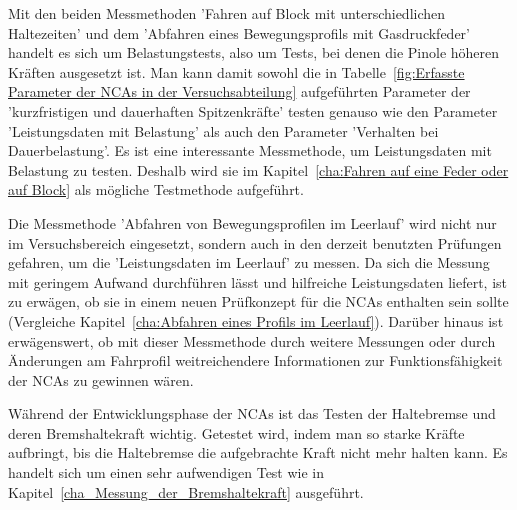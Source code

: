 

Mit den beiden Messmethoden 'Fahren auf Block mit unterschiedlichen Haltezeiten' und dem 'Abfahren eines Bewegungsprofils mit Gasdruckfeder' handelt es sich um Belastungstests, also um Tests, bei denen die Pinole höheren Kräften ausgesetzt ist. Man kann damit sowohl die in Tabelle~\ref{fig:Erfasste Parameter der NCAs in der Versuchsabteilung} aufgeführten Parameter der 'kurzfristigen und dauerhaften Spitzenkräfte' testen genauso wie den Parameter 'Leistungsdaten mit Belastung' als auch den Parameter 'Verhalten bei Dauerbelastung'. Es ist eine interessante Messmethode, um Leistungsdaten mit Belastung zu testen. Deshalb wird sie im Kapitel~\ref{cha:Fahren auf eine Feder oder auf Block} als mögliche Testmethode aufgeführt.


Die Messmethode 'Abfahren von Bewegungsprofilen im Leerlauf' wird nicht nur im Versuchsbereich eingesetzt, sondern auch in den derzeit benutzten Prüfungen gefahren, um die 'Leistungsdaten im Leerlauf' zu messen. Da sich die Messung mit geringem Aufwand durchführen lässt und hilfreiche Leistungsdaten liefert, ist zu erwägen, ob sie in einem neuen Prüfkonzept für die NCAs enthalten sein sollte (Vergleiche Kapitel~\ref{cha:Abfahren eines Profils im Leerlauf}). Darüber hinaus ist erwägenswert, ob mit dieser Messmethode durch weitere Messungen oder durch Änderungen am Fahrprofil weitreichendere Informationen zur Funktionsfähigkeit der NCAs zu gewinnen wären.








Während der Entwicklungsphase der NCAs ist das Testen der Haltebremse und deren Bremshaltekraft wichtig. Getestet wird, indem man so starke Kräfte aufbringt, bis die Haltebremse die aufgebrachte Kraft nicht mehr halten kann. Es handelt sich um einen sehr aufwendigen Test wie in Kapitel~\ref{cha_Messung_der_Bremshaltekraft} ausgeführt.



